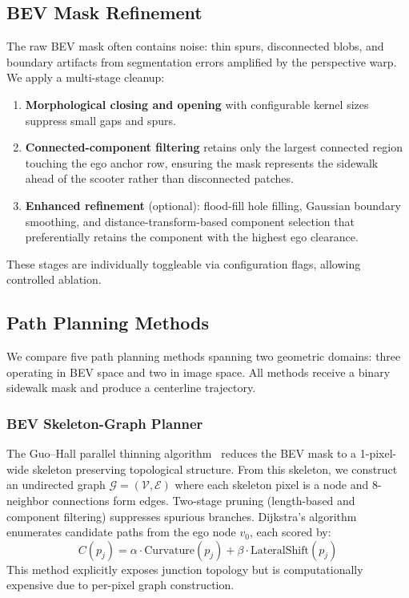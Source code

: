 \documentclass[a4paper,fleqn,10pt]{cas-dc}
\begin{document}
\subsection{BEV Mask Refinement}
\label{sec:mask_refinement}

The raw BEV mask often contains noise: thin spurs, disconnected blobs, and boundary artifacts from segmentation errors amplified by the perspective warp. We apply a multi-stage cleanup:

\begin{enumerate}[nosep]
    \item \textbf{Morphological closing and opening} with configurable kernel sizes suppress small gaps and spurs.
    \item \textbf{Connected-component filtering} retains only the largest connected region touching the ego anchor row, ensuring the mask represents the sidewalk ahead of the scooter rather than disconnected patches.
    \item \textbf{Enhanced refinement} (optional): flood-fill hole filling, Gaussian boundary smoothing, and distance-transform-based component selection that preferentially retains the component with the highest ego clearance.
\end{enumerate}

These stages are individually toggleable via configuration flags, allowing controlled ablation.


\subsection{Path Planning Methods}
\label{sec:planners}

We compare five path planning methods spanning two geometric domains: three operating in BEV space and two in image space. All methods receive a binary sidewalk mask and produce a centerline trajectory.

\subsubsection{BEV Skeleton-Graph Planner}
\label{sec:skeleton_planner}

The Guo--Hall parallel thinning algorithm~\cite{guo_hall} reduces the BEV mask to a 1-pixel-wide skeleton preserving topological structure. From this skeleton, we construct an undirected graph $\mathcal{G} = (\mathcal{V}, \mathcal{E})$ where each skeleton pixel is a node and 8-neighbor connections form edges. Two-stage pruning (length-based and component filtering) suppresses spurious branches. Dijkstra's algorithm enumerates candidate paths from the ego node $v_0$, each scored by:
\[
C(p_j) = \alpha \cdot \text{Curvature}(p_j) + \beta \cdot \text{LateralShift}(p_j)
\]
This method explicitly exposes junction topology but is computationally expensive due to per-pixel graph construction.
\end{document}

